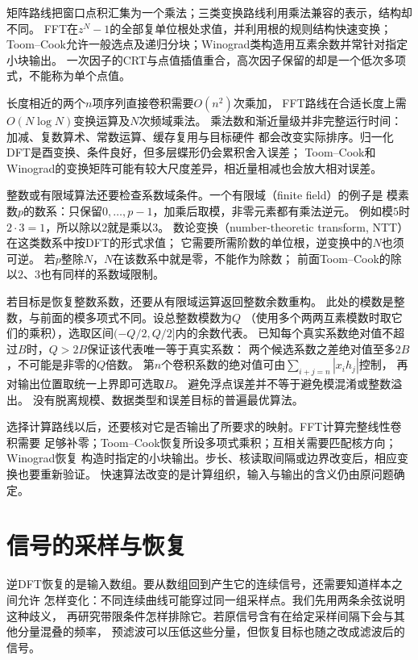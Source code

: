 矩阵路线把窗口点积汇集为一个乘法；三类变换路线利用乘法兼容的表示，结构却不同。
FFT在$z^N-1$的全部复单位根处求值，并利用根的规则结构快速变换；
Toom--Cook允许一般选点及递归分块；Winograd类构造用互素余数并常针对指定小块输出。
一次因子的CRT与点值插值重合，高次因子保留的却是一个低次多项式，不能称为单个点值。

长度相近的两个$n$项序列直接卷积需要$O(n^2)$次乘加，
FFT路线在合适长度上需$O(N\log N)$变换运算及$N$次频域乘法。
乘法数和渐近量级并非完整运行时间：加减、复数算术、常数运算、缓存复用与目标硬件
都会改变实际排序。归一化DFT是酉变换、条件良好，但多层蝶形仍会累积舍入误差；
Toom--Cook和Winograd的变换矩阵可能有较大尺度差异，相近量相减也会放大相对误差。

整数或有限域算法还要检查系数域条件。一个有限域（finite field）的例子是
模素数$p$的数系：只保留$0,\ldots,p-1$，加乘后取模，非零元素都有乘法逆元。
例如模$5$时$2\cdot3=1$，所以除以$2$就是乘以$3$。
数论变换（number-theoretic transform, NTT）在这类数系中按DFT的形式求值；
它需要所需阶数的单位根，逆变换中的$N$也须可逆。
若$p$整除$N$，$N$在该数系中就是零，不能作为除数；
前面Toom--Cook的除以$2$、$3$也有同样的系数域限制。

若目标是恢复整数系数，还要从有限域运算返回整数余数重构。
此处的模数是整数，与前面的模多项式不同。设总整数模数为$Q$
（使用多个两两互素模数时取它们的乘积），选取区间$(-Q/2,Q/2]$内的余数代表。
已知每个真实系数绝对值不超过$B$时，$Q>2B$保证该代表唯一等于真实系数：
两个候选系数之差绝对值至多$2B$，不可能是非零的$Q$倍数。
第$n$个卷积系数的绝对值可由$\sum_{i+j=n}|x_i h_j|$控制，
再对输出位置取统一上界即可选取$B$。
避免浮点误差并不等于避免模混淆或整数溢出。
没有脱离规模、数据类型和误差目标的普遍最优算法。

选择计算路线以后，还要核对它是否输出了所要求的映射。FFT计算完整线性卷积需要
足够补零；Toom--Cook恢复所设多项式乘积；互相关需要匹配核方向；Winograd恢复
构造时指定的小块输出。步长、核读取间隔或边界改变后，相应变换也要重新验证。
快速算法改变的是计算组织，输入与输出的含义仍由原问题确定。

\section{信号的采样与恢复}
\label{sec:signal-analysis-sampling}

逆DFT恢复的是输入数组。要从数组回到产生它的连续信号，还需要知道样本之间允许
怎样变化：不同连续曲线可能穿过同一组采样点。我们先用两条余弦说明这种歧义，
再研究带限条件怎样排除它。若原信号含有在给定采样间隔下会与其他分量混叠的频率，
预滤波可以压低这些分量，但恢复目标也随之改成滤波后的信号。

